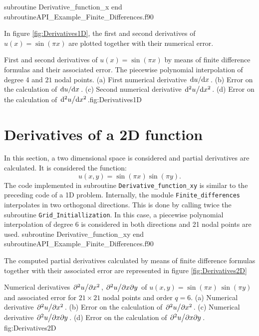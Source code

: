   
  
  \vspace{0.5cm} 
  {subroutine Derivative_function_x}
  {end subroutine}{API_Example_Finite_Differences.f90}
   
   In figure \ref{fig:Derivatives1D}, the first and second derivatives of $ u(x) = \sin (\pi x) $ are plotted together with their numerical error. 
   
     
            {  }{  }
            {First and second derivatives of $u(x) = \sin( \pi x ) $ by means of finite difference formulas and their associated error. The piecewise polynomial interpolation of degree 4 and $21$ nodal points. (a) First numerical derivative  \ensuremath{\dv*{u}{x}}. (b) Error on the calculation of \ensuremath{\dv*{u}{x}}. (c) Second numerical derivative  \ensuremath{\dv*[2]{u}{x}}. (d) Error on the calculation of \ensuremath{\dv*[2]{u}{x}}.}{fig:Derivatives1D}

  
\newpage 
  \section{Derivatives of a 2D function}
   In this section, a two dimensional space is considered and partial derivatives are calculated.  It is considered the function:
  \begin{equation*}
  	u(x,y) = \sin(\pi x)\sin(\pi y). 
  \end{equation*}
  The code implemented in subroutine \verb|Derivative_function_xy| is similar to the preceding code of a 1D problem. Internally, the module 
  \verb|Finite_differences| interpolates in two orthogonal directions. This is done by calling  twice the subroutine  \verb|Grid_Initiallization|.
  In this case, a piecewise polynomial interpolation of degree 6 is considered in both directions and 21 nodal points are used. 
   \vspace{0.5cm} 
   {subroutine Derivative_function_xy}
   {end subroutine}{API_Example_Finite_Differences.f90}
   
The computed partial derivatives calculated by means of finite difference formulas together with their associated error  are represented in  figure \ref{fig:Derivatives2D}
  \FloatBarrier
  
              {  }{  }
              {  Numerical derivatives \ensuremath{\pdv*[2]{u}{x}}, \ensuremath{\pdv*[2]{u}{x}{y}} of $ u(x,y) = \sin(\pi x) \ \sin(\pi y) $ and associated error for $21\times 21$ nodal points and order $q=6$. (a) Numerical derivative \ensuremath{\pdv*[2]{u}{x}}. (b) Error on the calculation of \ensuremath{\pdv*[2]{u}{x}}. (c) Numerical derivative  \ensuremath{\pdv*[2]{u}{x}{y}}. (d) Error on the calculation of \ensuremath{\pdv*[2]{u}{x}{y}}. }{fig:Derivatives2D}

